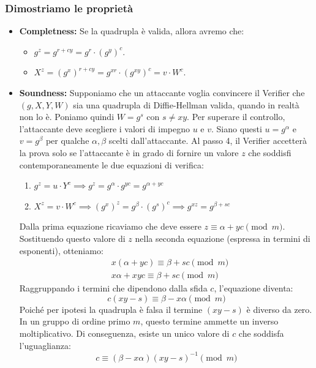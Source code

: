 \subsubsection*{Dimostriamo le proprietà}
\begin{itemize}
    \item \textbf{Completness:} Se la quadrupla è valida, allora avremo che:
        \begin{itemize}
            \item $g^z = g^{r+cy} = g^r \cdot (g^y)^c$.
            \item $X^z = (g^x)^{r+cy} = g^{xr} \cdot (g^{xy})^c = v \cdot W^c$.
        \end{itemize}
    \item \textbf{Soundness:} Supponiamo che un attaccante voglia convincere il Verifier che $(g, X, Y, W)$ sia una quadrupla di Diffie-Hellman valida, quando in realtà non lo è. 
    Poniamo quindi $W = g^s$ con $s \neq xy$. Per superare il controllo, l'attaccante deve scegliere i valori di impegno $u$ e $v$. Siano questi $u = g^\alpha$ e $v = g^\beta$ per qualche $\alpha, \beta$ scelti dall'attaccante. 
    Al passo 4, il Verifier accetterà la prova solo se l'attaccante è in grado di fornire un valore $z$ che soddisfi contemporaneamente le due equazioni di verifica:
    \begin{enumerate}
        \item $g^z = u \cdot Y^c \implies g^z = g^\alpha \cdot g^{yc} = g^{\alpha + yc}$
        \item $X^z = v \cdot W^c \implies (g^x)^z = g^\beta \cdot (g^s)^c \implies g^{xz} = g^{\beta + sc}$
    \end{enumerate}
    Dalla prima equazione ricaviamo che deve essere $z \equiv \alpha + yc \pmod m$. Sostituendo questo valore di $z$ nella seconda equazione (espressa in termini di esponenti), otteniamo:
    \begin{align*}
        &x(\alpha + yc) \equiv \beta + sc \pmod m\\
        &x\alpha + xyc \equiv \beta + sc \pmod m
    \end{align*}
    Raggruppando i termini che dipendono dalla sfida $c$, l'equazione diventa:
    \[c(xy - s) \equiv \beta - x\alpha \pmod m\]
    Poiché per ipotesi la quadrupla è falsa il termine $(xy - s)$ è diverso da zero. In un gruppo di ordine primo $m$, questo termine ammette un inverso moltiplicativo. 
    Di conseguenza, esiste un unico valore di $c$ che soddisfa l'uguaglianza:
    \[c \equiv (\beta - x\alpha)(xy - s)^{-1} \pmod m\]

\end{itemize}
